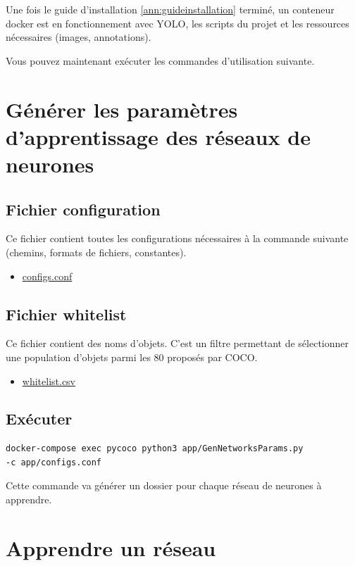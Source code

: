 \documentclass[debug,nodate,hideweeklyreports]{polytech/polytech}
\begin{document}
Une fois le guide d'installation \autoref{ann:guideinstallation} terminé, un conteneur docker est en fonctionnement avec YOLO, les scripts du projet et les ressources nécessaires (images, annotations).

Vous pouvez maintenant exécuter les commandes d'utilisation suivante.

\section{Générer les paramètres d'apprentissage des réseaux de neurones}

\subsection{Fichier configuration}

Ce fichier contient toutes les configurations nécessaires à la commande suivante (chemins, formats de fichiers, constantes).

\begin{itemize}
\item \href{https://github.com/JulienCheny/ImageTagging/blob/master/app/configs.conf}{configs.conf}
\end{itemize}
\subsection{Fichier whitelist}

Ce fichier contient des noms d'objets. C'est un filtre permettant de sélectionner une population d'objets parmi les 80 proposés par COCO.

\begin{itemize}
\item \href{https://github.com/JulienCheny/ImageTagging/blob/master/app/whitelist.csv}{whitelist.csv}
\end{itemize}

\subsection{Exécuter}

\begin{lstlisting}
docker-compose exec pycoco python3 app/GenNetworksParams.py
-c app/configs.conf
\end{lstlisting}

Cette commande va générer un dossier pour chaque réseau de neurones à apprendre.

\section{Apprendre un réseau}
\end{document}
